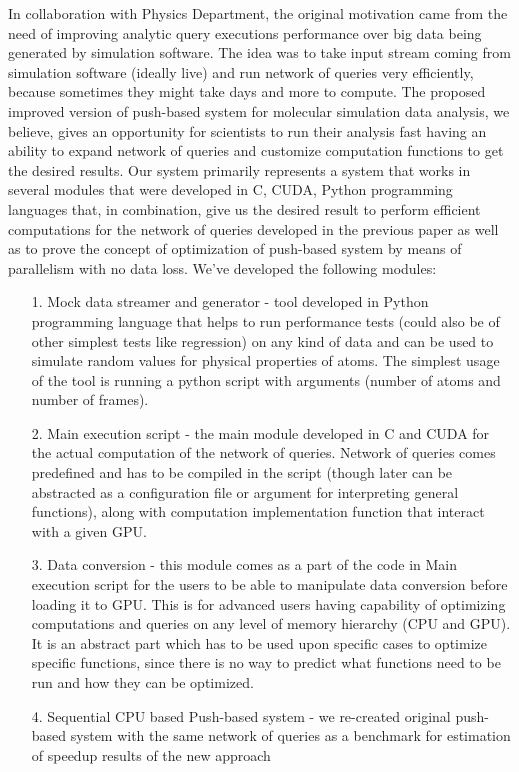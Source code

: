 \documentclass[11pt,a4paper]{report}
\begin{document}
In collaboration with Physics Department, the original motivation came from the need of improving analytic query executions performance over big data being generated by simulation software. The idea was to take input stream coming from simulation software (ideally live) and run network of queries very efficiently, because sometimes they might take days and more to compute. The proposed improved version of push-based system for molecular simulation data analysis, we believe, gives an opportunity for scientists to run their analysis fast having an ability to expand network of queries and customize computation functions to get the desired results. 
Our system primarily represents a system that works in several modules that were developed in C, CUDA, Python programming languages that, in combination, give us the desired result to perform efficient computations for the network of queries developed in the previous paper \cite{mainPaper} as well as to prove the concept of optimization of push-based system by means of parallelism with no data loss. We've developed the following modules:

\begin{itemize}
\item[1.] Mock data streamer and generator - tool developed in Python programming language that helps to run performance tests (could also be of other simplest tests like regression) on any kind of data and can be used to simulate random values for physical properties of atoms. The simplest usage of the tool is running a python script with arguments (number of atoms and number of frames).
\item[2.] Main execution script - the main module developed in C and CUDA for the actual computation of the network of queries. Network of queries comes predefined and has to be compiled in the script (though later can be abstracted as a configuration file or argument for interpreting general functions), along with computation implementation function that interact with a given GPU.
\item[3.] Data conversion - this module comes as a part of the code in Main execution script for the users to be able to manipulate data conversion before loading it to GPU. This is for advanced users having capability of optimizing computations and queries on any level of memory hierarchy (CPU and GPU). It is an abstract part which has to be used upon specific cases to optimize specific functions, since there is no way to predict what functions need to be run and how they can be optimized.
\item[4.] Sequential CPU based Push-based system - we re-created original push-based system with the same network of queries as a benchmark for estimation of speedup results of the new approach

\end{itemize}
\end{document}
